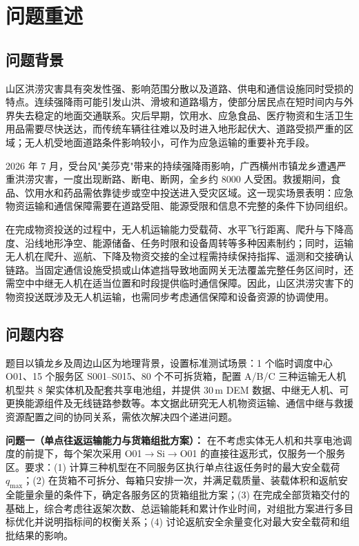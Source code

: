 \section{问题重述}

\subsection{问题背景}

山区洪涝灾害具有突发性强、影响范围分散以及道路、供电和通信设施同时受损的特点。连续强降雨可能引发山洪、滑坡和道路塌方，使部分居民点在短时间内与外界失去稳定的地面交通联系。灾后早期，饮用水、应急食品、医疗物资和生活卫生用品需要尽快送达，而传统车辆往往难以及时进入地形起伏大、道路受损严重的区域；无人机受地面道路条件影响较小，可作为应急运输的重要补充手段\cite{ref_xinhua,ref_dianxun}。

2026 年 7 月，受台风"美莎克"带来的持续强降雨影响，广西横州市镇龙乡遭遇严重洪涝灾害，一度出现断路、断电、断网，全乡约 8000 人受困。救援期间，食品、饮用水和药品需依靠徒步或空中投送进入受灾区域。这一现实场景表明：应急物资运输和通信保障需要在道路受阻、能源受限和信息不完整的条件下协同组织。

在完成物资投送的过程中，无人机运输能力受载荷、水平飞行距离、爬升与下降高度、沿线地形净空、能源储备、任务时限和设备周转等多种因素制约；同时，运输无人机在爬升、巡航、下降及物资交接的全过程需持续保持指挥、遥测和交接确认链路。当固定通信设施受损或山体遮挡导致地面网关无法覆盖完整任务区间时，还需空中中继无人机在适当位置和时段提供临时通信保障。因此，山区洪涝灾害下的物资投送既涉及无人机运输，也需同步考虑通信保障和设备资源的协调使用。

\subsection{问题内容}

题目以镇龙乡及周边山区为地理背景，设置标准测试场景：1 个临时调度中心 O01、15 个服务区 S001--S015、80 个不可拆货箱，配置 A/B/C 三种运输无人机机型共 8 架实体机及配套共享电池组，并提供 30\,m DEM 数据、中继无人机、可更换能源组件及无线链路参数等。本文据此研究无人机物资运输、通信中继与救援资源配置之间的协同关系，需依次解决四个递进问题。

\textbf{问题一（单点往返运输能力与货箱组批方案）：} 在不考虑实体无人机和共享电池调度的前提下，每个架次采用 O01$\to$Si$\to$O01 的直接往返形式，仅服务一个服务区。要求：(1) 计算三种机型在不同服务区执行单点往返任务时的最大安全载荷 $q_{\max}$；(2) 在货箱不可拆分、每箱只安排一次，并满足载质量、装载体积和返航安全能量余量的条件下，确定各服务区的货箱组批方案；(3) 在完成全部货箱交付的基础上，综合考虑往返架次数、总运输能耗和累计作业时间，对组批方案进行多目标优化并说明指标间的权衡关系；(4) 讨论返航安全余量变化对最大安全载荷和组批结果的影响。

